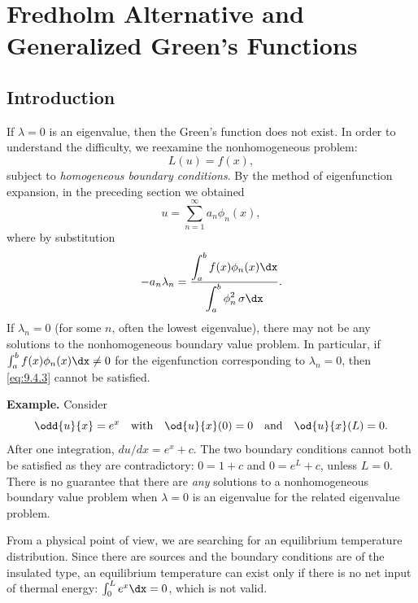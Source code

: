 \section{Fredholm Alternative and Generalized Green's Functions}
\label{sec:fredholm-alt}

\subsection{Introduction}
\label{sec:fredholm-intro}

If $\lambda = 0$ is an eigenvalue, then the Green's function does not exist.  In order to understand the difficulty, we reexamine the nonhomogeneous problem:
\begin{equation}
\label{eq:9.4.1}
L(u) = f(x),
\end{equation}
subject to \emph{homogeneous boundary conditions}.  By the method of eigenfunction expansion, in the preceding section we obtained
\begin{equation}
\label{eq:9.4.2}
u = \sum_{n=1}^{\infty} a_n\phi_n(x),
\end{equation}
where by substitution
\begin{equation}
\label{eq:9.4.3}
-a_n\lambda_n = \frac{\displaystyle\int_a^b f(x)\phi_n(x)\dx}{\displaystyle\int_a^b \phi_n^2\,\sigma\dx}.
\end{equation}
If $\lambda_n = 0$ (for some $n$, often the lowest eigenvalue), there may not be any solutions to the nonhomogeneous boundary value problem.  In particular, if $\int_a^b f(x)\phi_n(x)\dx \neq 0$ for the eigenfunction corresponding to $\lambda_n = 0$, then \eqref{eq:9.4.3} cannot be satisfied.

\textbf{Example.}
Consider
\begin{equation}
\label{eq:9.4.4}
\odd{u}{x} = e^x \quad\text{with}\quad \od{u}{x}(0) = 0 \quad\text{and}\quad \od{u}{x}(L) = 0.
\end{equation}
After one integration, $du/dx = e^x + c$.  The two boundary conditions cannot both be satisfied as they are contradictory: $0 = 1 + c$ and $0 = e^L + c$, unless $L = 0$.  There is no guarantee that there are \emph{any} solutions to a nonhomogeneous boundary value problem when $\lambda = 0$ is an eigenvalue for the related eigenvalue problem.

From a physical point of view, we are searching for an equilibrium temperature distribution.  Since there are sources and the boundary conditions are of the insulated type, an equilibrium temperature can exist only if there is no net input of thermal energy: $\int_0^L e^x\dx = 0$, which is not valid.

